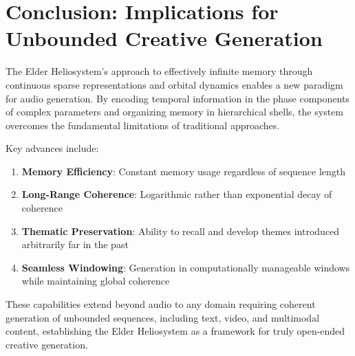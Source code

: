 \section{Conclusion: Implications for Unbounded Creative Generation}

The Elder Heliosystem's approach to effectively infinite memory through continuous sparse representations and orbital dynamics enables a new paradigm for audio generation. By encoding temporal information in the phase components of complex parameters and organizing memory in hierarchical shells, the system overcomes the fundamental limitations of traditional approaches.

Key advances include:

\begin{enumerate}
    \item \textbf{Memory Efficiency}: Constant memory usage regardless of sequence length
    \item \textbf{Long-Range Coherence}: Logarithmic rather than exponential decay of coherence
    \item \textbf{Thematic Preservation}: Ability to recall and develop themes introduced arbitrarily far in the past
    \item \textbf{Seamless Windowing}: Generation in computationally manageable windows while maintaining global coherence
\end{enumerate}

These capabilities extend beyond audio to any domain requiring coherent generation of unbounded sequences, including text, video, and multimodal content, establishing the Elder Heliosystem as a framework for truly open-ended creative generation.